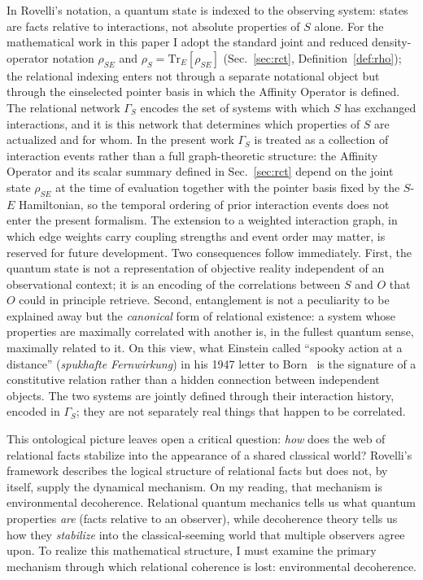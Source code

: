 In Rovelli's notation, a quantum state is indexed to the observing
system: states are facts relative to interactions, not absolute
properties of $S$ alone.
For the mathematical work in this paper I adopt the standard joint
and reduced density-operator notation $\rho_{SE}$ and
$\rho_S = \mathrm{Tr}_E[\rho_{SE}]$ (Sec.~\ref{sec:rct},
Definition~\ref{def:rho}); the relational indexing enters not through
a separate notational object but through the einselected pointer basis
in which the Affinity Operator is defined.
The relational network $\Gamma_S$ encodes the set of systems
with which $S$ has exchanged interactions, and it is this network that
determines which properties of $S$ are actualized and for whom.
In the present work $\Gamma_S$ is treated as a collection of
interaction events rather than a full graph-theoretic structure: the
Affinity Operator and its scalar summary defined in
Sec.~\ref{sec:rct} depend on the joint state $\rho_{SE}$ at the time
of evaluation together with the pointer basis fixed by the
$S$-$E$ Hamiltonian, so the temporal ordering of prior interaction
events does not enter the present formalism.
The extension to a weighted interaction graph, in which edge weights
carry coupling strengths and event order may matter, is reserved for
future development.
Two consequences follow immediately.
First, the quantum state is not a representation of objective reality
independent of an observational context; it is an encoding of the
correlations between $S$ and $O$ that $O$ could in principle retrieve.
Second, entanglement is not a peculiarity to be explained away but the
\emph{canonical} form of relational existence: a system whose properties
are maximally correlated with another is, in the fullest quantum sense,
maximally related to it.
On this view, what Einstein called ``spooky action at a distance'' (\emph{spukhafte Fernwirkung}) in his 1947 letter to Born~\cite{EinsteinBorn1947} is the signature of a constitutive relation rather than a hidden connection between independent objects. The two systems are jointly defined through their interaction history, encoded in $\Gamma_S$; they are not separately real things that happen to be correlated.

This ontological picture leaves open a critical question: \emph{how}
does the web of relational facts stabilize into the appearance of a
shared classical world?
Rovelli's framework describes the logical structure of relational
facts but does not, by itself, supply the dynamical mechanism.
On my reading, that mechanism is environmental decoherence.
Relational quantum mechanics tells us what quantum properties \emph{are} (facts relative to an observer), while decoherence
theory tells us how they \emph{stabilize} into the classical-seeming
world that multiple observers agree upon.
To realize this mathematical structure, I must examine the primary
mechanism through which relational coherence is lost: environmental
decoherence.

